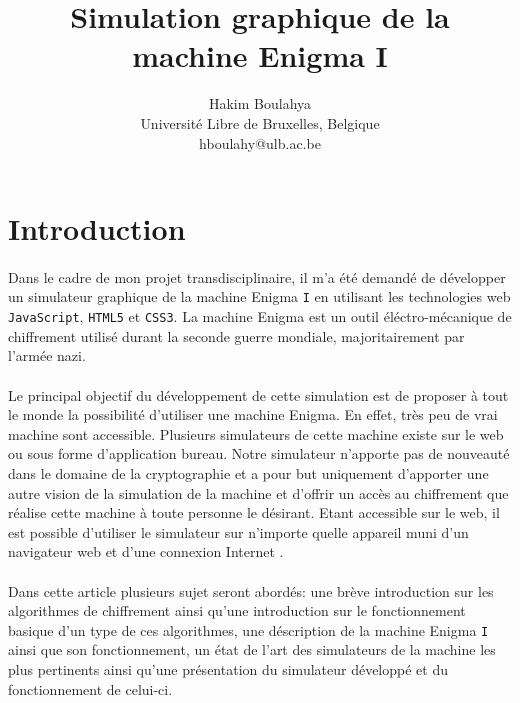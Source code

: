 \documentclass[letterpaper]{article}
\title{Simulation graphique de la machine Enigma I}
\author{Hakim Boulahya \\
Université Libre de Bruxelles, Belgique\\
hboulahy@ulb.ac.be}
\begin{document}
\maketitle

\begin{abstract}
\end{abstract}


\section{Introduction}


\paragraph{}

Dans le cadre de mon projet transdisciplinaire, il m'a été demandé de développer un simulateur graphique de la machine Enigma \texttt{I} en utilisant les technologies web \texttt{JavaScript}, \texttt{HTML5} et \texttt{CSS3}. La machine Enigma est un outil éléctro-mécanique de chiffrement utilisé durant la seconde guerre mondiale, majoritairement par l'armée nazi.

\paragraph{}
Le principal objectif du développement de cette simulation est de proposer à tout le monde la possibilité d'utiliser une machine Enigma. En effet, très peu de vrai machine sont accessible. Plusieurs simulateurs de cette machine existe sur le web ou sous forme d'application bureau. Notre simulateur n'apporte pas de nouveauté dans le domaine de la cryptographie et a pour but uniquement d'apporter une autre vision de la simulation de la machine et d'offrir un accès au chiffrement que réalise cette machine à toute personne le désirant. Etant accessible sur le web, il est possible d'utiliser le simulateur sur n'importe quelle appareil muni d'un navigateur web et d'une connexion Internet .

\paragraph{}

Dans cette article plusieurs sujet seront abordés: une brève introduction sur les algorithmes de chiffrement ainsi qu'une introduction sur le fonctionnement basique d'un type de ces algorithmes, une déscription de la machine Enigma \texttt{I} ainsi que son fonctionnement, un état de l'art des simulateurs de la machine les plus pertinents ainsi qu'une présentation du simulateur développé et du fonctionnement de celui-ci.
\end{document}
